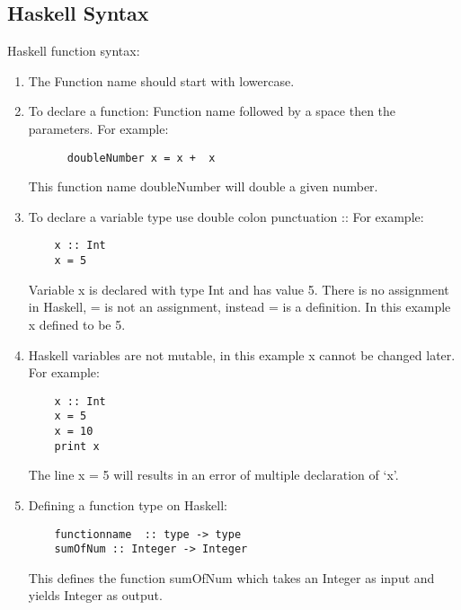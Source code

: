 \documentclass{article}
\begin{document}
\subsection{Haskell Syntax}
Haskell function syntax:
\begin{enumerate}
\item The Function name should start with lowercase.
\item To declare a function: Function name followed by a space then the parameters. 
\newline \newline For example: 
\begin{lstlisting}
	  doubleNumber x = x +  x    
\end{lstlisting} 
This function name doubleNumber will double a given number.
\newline
\item To declare a variable type use double colon punctuation ::
 \newline \newline For example: 
\begin{lstlisting}
	x :: Int
	x = 5
\end{lstlisting}
                     Variable x is declared with type Int and has value 5.
                     \newline
                     \newline
                     There is no assignment in Haskell, = is not an assignment, instead = is a definition. In this example x defined to be 5. 
\newline
\item Haskell variables are not mutable, in this example x cannot be changed later. 
\newline \newline For example:  
\begin{lstlisting}
	x :: Int
	x = 5
	x = 10 
	print x
\end{lstlisting}
     The line x = 5 will results in an error of multiple declaration of ‘x’.
     \newline
\item  Defining a function type on Haskell:
\begin{lstlisting}
	functionname  :: type -> type
	sumOfNum :: Integer -> Integer
\end{lstlisting}
         This defines the function sumOfNum which takes an Integer  as input and yields Integer as output.
\end{enumerate}
\end{document}
